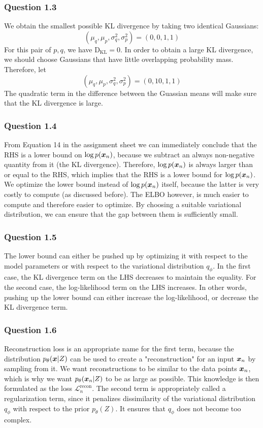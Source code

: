 \documentclass{article}
\begin{document}
\subsubsection*{Question 1.3}
We obtain the smallest possible KL divergence by taking two identical Gaussians:
$$
(\mu_q, \mu_p, \sigma^2_q, \sigma^2_p) = (0, 0, 1, 1)
$$ For this pair of $p, q$, we have $\text{D}_{\text{KL}} = 0$. In order to obtain a large KL divergence, we should choose Gaussians that have little overlapping probability mass. Therefore, let 
$$
(\mu_q, \mu_p, \sigma^2_q, \sigma^2_p) = (0, 10, 1, 1)
$$ The quadratic term in the difference between the Guassian means will make sure that the KL divergence is large.
\newpage
\subsubsection*{Question 1.4}
From Equation 14 in the assignment sheet we can immediately conclude that the RHS is a lower bound on $\log p(\boldsymbol{x}_n)$, because we subtract an always non-negative quantity from it (the KL divergence). Therefore, $\log p(\boldsymbol{x}_n)$ is always larger than or equal to the RHS, which implies that the RHS is a lower bound for $\log p(\boldsymbol{x}_n)$.
We optimize the lower bound instead of $\log p(\boldsymbol{x}_n)$ itself, because the latter is very costly to compute (as discussed before). The ELBO however, is much easier to compute and therefore easier to optimize. By choosing a suitable variational distribution, we can ensure that the gap between them is sufficiently small.
\subsubsection*{Question 1.5}
The lower bound can either be pushed up by optimizing it with respect to the model parameters or with respect to the variational distribution $q_{\phi}$. In the first case, the KL divergence term on the LHS decreases to maintain the equality. For the second case, the log-likelihood term on the LHS increases. In other words, pushing up the lower bound can either increase the log-likelihood, or decrease the KL divergence term.
\subsubsection*{Question 1.6}
Reconstruction loss is an appropriate name for the first term, because the distribution $p_\theta(\boldsymbol{x} | Z)$ can be used to create a "reconstruction" for an input $\boldsymbol{x}_n$ by sampling from it. We want reconstructions to be similar to the data points $\boldsymbol{x}_n$, which is why we want $p_\theta(\boldsymbol{x}_n | Z)$ to be as large as possible. This knowledge is then formulated as the loss $\mathcal{L}^{\text{recon}}_n$. The second term is appropriately called a regularization term, since it penalizes dissimilarity of the variational distribution $q_{\phi}$ with respect to the prior $p_\theta(Z)$. It ensures that $q_{\phi}$ does not become too complex. 
\end{document}
